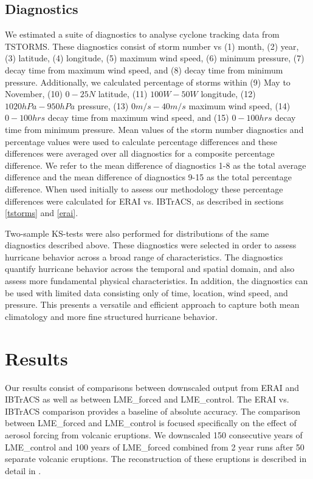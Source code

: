 \subsection{Diagnostics}
\label{diags}
We estimated a suite of diagnostics to analyse cyclone tracking data from TSTORMS. These diagnostics consist of storm number vs (1) month, (2) year, (3) latitude, (4) longitude, (5) maximum wind speed, (6) minimum pressure, (7) decay time from maximum wind speed, and (8) decay time from minimum pressure. Additionally, we calculated percentage of storms within (9) May to November, (10) $0-25N$ latitude, (11) $100W-50W$ longitude, (12) $1020hPa-950hPa$ pressure, (13) $0m/s-40m/s$ maximum wind speed, (14) $0-100hrs$ decay time from maximum wind speed, and (15) $0-100hrs$ decay time from minimum pressure. Mean values of the storm number diagnostics and percentage values were used to calculate percentage differences and these differences were averaged over all diagnostics for a composite percentage difference. We refer to the mean difference of diagnostics 1-8 as the total average difference and the mean difference of diagnostics 9-15 as the total percentage difference.  When used initially to assess our methodology these percentage differences were calculated for ERAI vs. IBTrACS, as described in sections \ref{tstorms} and \ref{erai}. 
\par
Two-sample KS-tests were also performed for distributions of the same diagnostics described above. These diagnostics were selected in order to assess hurricane behavior across a broad range of characteristics. The diagnostics quantify hurricane behavior across the temporal and spatial domain, and also assess more fundamental physical characteristics. In addition, the diagnostics can be used with limited data consisting only of time, location, wind speed, and pressure. This presents a versatile and efficient approach to capture both mean climatology and more fine structured hurricane behavior.       

\section{Results}
\label{results}
Our results consist of comparisons between downscaled output from ERAI and IBTrACS as well as between LME_{forced} and LME_{control}. The ERAI vs. IBTrACS comparison provides a baseline of absolute accuracy. The comparison between LME_{forced} and LME_{control} is focused specifically on the effect of aerosol forcing from volcanic eruptions. We downscaled 150 consecutive years of LME_{control} and 100 years of LME_{forced} combined from 2 year runs after 50 separate volcanic eruptions. The reconstruction of these eruptions is described in detail in \cite{erups_recon}.    

